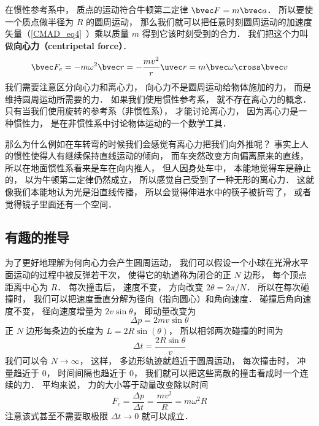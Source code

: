 

在惯性参考系中， 质点的运动符合牛顿第二定律 $\bvec F = m\bvec a$． 所以要使一个质点做半径为 $R$ 的圆周运动， 那么我们就可以把任意时刻圆周运动的加速度矢量（\autoref{CMAD_eq4}~）乘以质量 $m$ 得到它该时刻受到的合力． 我们把这个力叫做\textbf{向心力（centripetal force）}．
\begin{equation}
\bvec F_c = -m \omega^2 \bvec r = -\frac{mv^2}{r}\uvec r = m\bvec \omega \cross \bvec v
\end{equation}
我们需要注意区分向心力和离心力， 向心力不是圆周运动给物体施加的力， 而是维持圆周运动所需要的力． 如果我们使用惯性参考系， 就不存在离心力的概念． 只有当我们使用旋转的参考系（非惯性系）， 才能讨论离心力， 因为离心力是一种惯性力， 是在非惯性系中讨论物体运动的一个数学工具．

那么为什么例如在车转弯的时候我们会感觉有离心力把我们向外推呢？ 事实上人的惯性使得人有继续保持直线运动的倾向， 而车突然改变方向偏离原来的直线， 所以在地面惯性系看来是车在向内推人， 但人因身处车中， 本能地觉得车是静止的， 以为牛顿第二定律仍然成立， 所以感觉自己受到了一种无形的离心力． 这就像我们本能地认为光是沿直线传播， 所以会觉得伸进水中的筷子被折弯了， 或者觉得镜子里面还有一个空间．

\subsection{有趣的推导}
为了更好地理解为何向心力会产生圆周运动， 我们可以假设一个小球在光滑水平面运动的过程中被反弹若干次， 使得它的轨道称为闭合的正 $N$ 边形， 每个顶点距离中心为 $R$． 每次撞击后， 速度不变， 方向改变 $2\theta  = 2\pi/N$．
所以在每次碰撞时， 我们可以把速度垂直分解为径向（指向圆心）和角向速度． 碰撞后角向速度不变， 径向速度增量为 $2v\sin\theta$， 即动量改变为
\begin{equation}
\Delta p = 2mv\sin\theta
\end{equation}
正 $N$ 边形每条边的长度为 $L = 2R\sin(\theta)$， 所以相邻两次碰撞的时间为
\begin{equation}
\Delta t = \frac{2R\sin\theta}{v}
\end{equation}
我们可以令 $N \to \infty$， 这样， 多边形轨迹就趋近于圆周运动， 每次撞击时， 冲量趋近于 0， 时间间隔也趋近于 0， 我们就可以把这些离散的撞击看成时一个连续的力． 平均来说， 力的大小等于动量改变除以时间
\begin{equation}
F_c = \frac{\Delta p}{\Delta t} = \frac{mv^2}{R} = m\omega^2 R
\end{equation}
注意该式甚至不需要取极限 $\Delta t \to 0$ 就可以成立．

